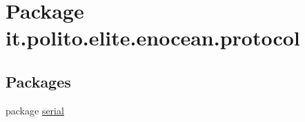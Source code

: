 \hypertarget{namespaceit_1_1polito_1_1elite_1_1enocean_1_1protocol}{}\section{Package it.\+polito.\+elite.\+enocean.\+protocol}
\label{namespaceit_1_1polito_1_1elite_1_1enocean_1_1protocol}
\subsection*{Packages}
\begin{DoxyCompactItemize}
\item 
package \hyperlink{namespaceit_1_1polito_1_1elite_1_1enocean_1_1protocol_1_1serial}{serial}
\end{DoxyCompactItemize}
